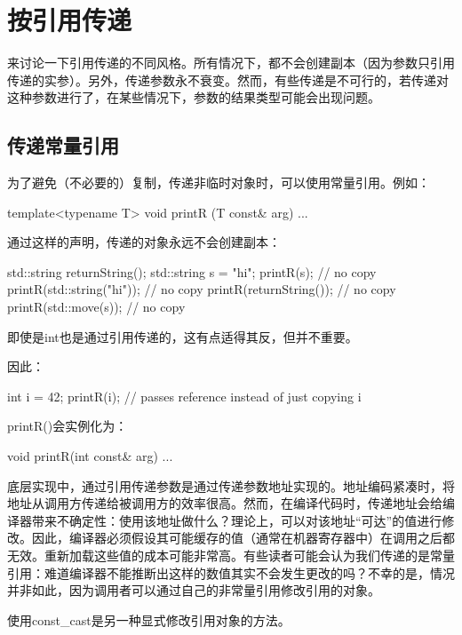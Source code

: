 \section{按引用传递}

来讨论一下引用传递的不同风格。所有情况下，都不会创建副本（因为参数只引用传递的实参）。另外，传递参数永不衰变。然而，有些传递是不可行的，若传递对这种参数进行了，在某些情况下，参数的结果类型可能会出现问题。

\subsection{传递常量引用}

为了避免（不必要的）复制，传递非临时对象时，可以使用常量引用。例如：

\begin{cpp}
template<typename T>
void printR (T const& arg) {
	...
}
\end{cpp}

通过这样的声明，传递的对象永远不会创建副本：

\begin{cpp}
std::string returnString();
std::string s = "hi";
printR(s); // no copy
printR(std::string("hi")); // no copy
printR(returnString()); // no copy
printR(std::move(s)); // no copy
\end{cpp}

即使是int也是通过引用传递的，这有点适得其反，但并不重要。

因此：

\begin{cpp}
int i = 42;
printR(i); // passes reference instead of just copying i
\end{cpp}

printR()会实例化为：

\begin{cpp}
void printR(int const& arg) {
	...
}
\end{cpp}

底层实现中，通过引用传递参数是通过传递参数地址实现的。地址编码紧凑时，将地址从调用方传递给被调用方的效率很高。然而，在编译代码时，传递地址会给编译器带来不确定性：使用该地址做什么？理论上，可以对该地址“可达”的值进行修改。因此，编译器必须假设其可能缓存的值（通常在机器寄存器中）在调用之后都无效。重新加载这些值的成本可能非常高。有些读者可能会认为我们传递的是常量引用：难道编译器不能推断出这样的数值其实不会发生更改的吗？不幸的是，情况并非如此，因为调用者可以通过自己的非常量引用修改引用的对象。

\begin{notice}
使用const\_cast是另一种显式修改引用对象的方法。
\end{notice}


